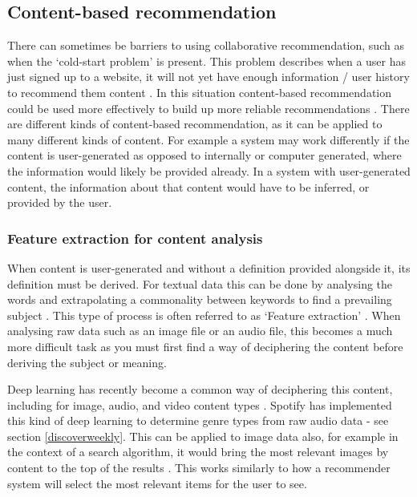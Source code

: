 \documentclass[a4paper,12pt]{report}
\begin{document}
    \subsection{Content-based recommendation}
      There can sometimes be barriers to using collaborative recommendation, such as when the ‘cold-start problem’ is present. This problem describes when a user has just signed up to a website, it will not yet have enough information / user history to recommend them content \citep{schein2002methods}.
      In this situation content-based recommendation could be used more effectively to build up more reliable recommendations \citep{lops2011content}.
      There are different kinds of content-based recommendation, as it can be applied to many different kinds of content. For example a system may work differently if the content is user-generated as opposed to internally or computer generated, where the information would likely be provided already. In a system with user-generated content, the information about that content would have to be inferred, or provided by the user.

      \subsubsection{Feature extraction for content analysis}
        When content is user-generated and without a definition provided alongside it, its definition must be derived. For textual data this can be done by analysing the words and extrapolating a commonality between keywords to find a prevailing subject \citep{sanderson1999deriving}.
        This type of process is often referred to as ‘Feature extraction’ \citep{guyon2006introduction}.
        When analysing raw data such as an image file or an audio file, this becomes a much more difficult task as you must first find a way of deciphering the content before deriving the subject or meaning.

        Deep learning has recently become a common way of deciphering this content, including for image, audio, and video content types \citep{coates2011analysis,ciregan2012multi,lee2009unsupervised,mobahi2009deep}.
        Spotify has implemented this kind of deep learning to determine genre types from raw audio data - see section \ref{discoverweekly}.
        This can be applied to image data also, for example in the context of a search algorithm, it would bring the most relevant images by content to the top of the results \citep{yee2003faceted}. This works similarly to how a recommender system will select the most relevant items for the user to see.
\end{document}
